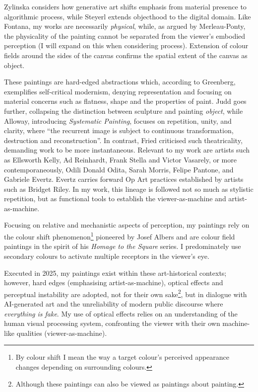 \documentclass[12pt]{article}
\begin{document}
Zylinska considers how generative art shifts emphasis from material
presence to algorithmic process,\autocite{zylinska2020ai} while Steyerl
extends objecthood to the digital domain.\autocite{steyerl2017duty} Like
Fontana, my works are necessarily
\emph{physical},\autocite{fontana1947spatial} while, as argued by
Merleau-Ponty, the physicality of the painting cannot be separated
from the viewer's embodied perception (I will expand on this when
considering process).\autocite{merleauponty1964eye} Extension of colour
fields around the sides of the canvas confirms the spatial extent of
the canvas as object.

These paintings are hard-edged abstractions which, according to
Greenberg, exemplifies self-critical modernism, denying representation
and focusing on material concerns such as flatness, shape and the
properties of paint.\autocite[p.~85--93]{Greenberg1961} Judd goes further,
collapsing the distinction between sculpture and painting
\emph{object}\autocite{Judd1965}, while Alloway, introducing
\emph{Systematic Painting}, focuses on repetition, unity, and clarity,
where ``the recurrent image is subject to continuous transformation,
destruction and reconstruction''.\autocite[pp.~18--19]{Alloway1975} In
contrast, Fried criticised such theatricality, demanding work to be
more instantaneous.\autocite[pp.~12--23]{Fried1968} Relevant to my work are
artists such as Ellsworth Kelly, Ad Reinhardt, Frank Stella and Victor
Vasarely, or more contemporaneously, Odili Donald Odita, Sarah Morris,
Felipe Pantone, and Gabriele Evertz. Evertz carries forward Op Art
practices\autocite{Follin2004EmbodiedVisions,Seitz1965ResponsiveEye}
established by artists such as Bridget
Riley.\autocite{Riley2019EyesMind,Riley2019DialoguesOnArt} In my work,
this lineage is followed not so much as stylistic repetition, but as
functional tools to establish the viewer-as-machine and artist-as-machine.

Focusing on relative and mechanistic aspects of perception, my
paintings rely on the colour shift phenomenon\footnote{By colour shift
  I mean the way a target colour’s perceived appearance changes
  depending on surrounding colours.} pioneered by Josef
Albers\autocite{albers} and are colour field paintings in the spirit
of his \emph{Homage to the Square} series. I predominately use
secondary colours to activate multiple receptors in the viewer's
eye.\autocite{HurvichJameson1957,Land1977,SchnapfKraftBaylor1987}

Executed in 2025, my paintings exist within these art-historical
contexts; however, hard edges (emphasising artist-as-machine),
optical effects and perceptual instability are adopted, not for their
own sake\footnote{Although these paintings can also be viewed as
  paintings about painting.}, but in dialogue with AI-generated art
and the unreliability of modern public discourse where \emph{everything is
fake}.\autocite[p.~105]{mcintyre2018posttruth} My use of optical effects relies on an understanding of the human
visual processing system, confronting the viewer with their own
machine-like qualities (viewer-as-machine).
\end{document}
